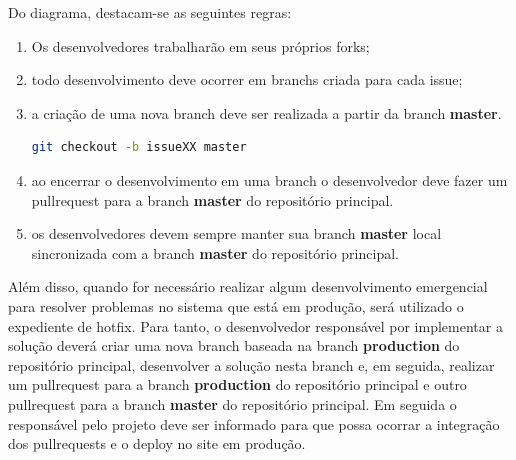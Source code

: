 Do diagrama, destacam-se as seguintes regras:
\begin{enumerate}
\item Os desenvolvedores trabalharão em seus próprios \glspl{fork};
\item todo desenvolvimento deve ocorrer em \glspl{branch} criada para cada \gls{issue};
\item a criação de uma nova \gls{branch} deve ser realizada a partir da \gls{branch} \textbf{master}.
\begin{lstlisting}[language=bash,caption={Sugestão de comando para criar nova branch baseada na master}]
git checkout -b issueXX master
\end{lstlisting}
\item ao encerrar o desenvolvimento em uma \gls{branch} o desenvolvedor deve fazer um \gls{pullrequest} para a \gls{branch} \textbf{master} do repositório principal.
\item os desenvolvedores devem sempre manter sua \gls{branch} \textbf{master} local sincronizada com a \gls{branch} \textbf{master} do repositório principal.
\end{enumerate}

Além disso, quando for necessário realizar algum desenvolvimento emergencial para resolver problemas no sistema que está em produção, será utilizado o expediente de \gls{hotfix}. Para tanto, o desenvolvedor responsável por implementar a solução deverá criar uma nova \gls{branch} baseada na \gls{branch} \textbf{production} do repositório principal, desenvolver a solução nesta \gls{branch} e, em seguida, realizar um \gls{pullrequest} para a \gls{branch} \textbf{production} do repositório principal e outro \gls{pullrequest} para a \gls{branch} \textbf{master} do repositório principal. Em seguida o responsável pelo projeto deve ser informado para que possa ocorrar a integração dos \glspl{pullrequest} e o \gls{deploy} no site em produção.

